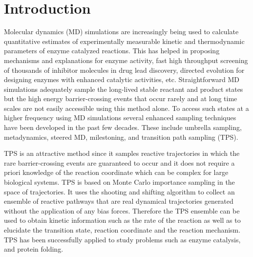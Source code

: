 \documentclass[journal=jpcbfk,manuscript=article,layout=traditional]{achemso}
\begin{document}
\section{Introduction}
Molecular dynamics (MD) simulations are increasingly being
used to calculate quantitative estimates of experimentally measurable 
kinetic and thermodynamic parameters of enzyme catalyzed reactions. 
\cite{Karplus02NatStructMolBiol9p646,
Schramm98AnnuRevBiochem67p693,Zhang05AccChemRes38p379,
Schramm11AnnuRevBiochem80p703,Schramm18ChemRev118p11194} 
This has helped in proposing mechanisms and explanations for 
enzyme activity, fast high throughput screening of thousands of inhibitor 
molecules in drug lead discovery, \cite{Jorgensen09AccChemRes42p724,Sliwoski14PharmacolRev66p334} 
directed evolution for designing enzymes with enhanced catalytic 
activities, \cite{Nunez06JPhysChemA110p463,Thyme09Nature461p1300,
Bloom09PNAS106p9995,Zoi16JAmChemSoc138p3403,Schafer19JAmChemSoc141p10431} etc.    
Straightforward MD simulations adequately sample 
the long-lived stable reactant and product states 
but the high energy barrier-crossing events that occur rarely and at long 
time scales are not easily accessible using this method alone.
To access such states at a higher frequency using MD simulations 
several enhanced sampling techniques 
have been developed in the past few decades. These include 
umbrella sampling, \cite{Kastner11WileyInterdiscipRevComputMolSci1p932} 
metadynamics, \cite{Barducci11WileyInterdiscipRevComputMolSci1p826}
steered MD, \cite{Park04JChemPhys120p5946}
milestoning, \cite{Faradjian04JChemPhys120p10880} and transition path sampling 
(TPS). \cite{Pratt86JChemPhys85p5045,Bolhuis02AnnRevPhysChem53p291,
Dellago98JChemPhys108p1964,Bolhuis21AdvTheory4p2000237}

TPS is an attractive method since it samples reactive trajectories
in which the rare barrier-crossing events are guaranteed to occur and
it does not require a priori knowledge of the reaction coordinate which can be 
complex for large biological systems.
TPS is based on Monte Carlo importance sampling in the 
space of trajectories. It uses the shooting and shifting algorithm 
to collect an ensemble of reactive pathways that are real dynamical 
trajectories generated without the application of any bias forces. \cite{dellago02AdvChemPhys123} 
Therefore the TPS ensemble can be used to obtain 
kinetic information such as the rate of the reaction as well as to elucidate 
the transition state, reaction coordinate and the reaction mechanism. 
TPS has been successfully applied to study problems such as enzyme catalysis, 
\cite{Basner05JAmChemSoc127p13822,Ramon07JPhysChemB111p5708,Hay12NatChem4p161,Schwartz09NatChemBiol5p551} 
and protein folding. \cite{Bolhuis03ProcNatlAcadSci100p12129,Juraszek12ChemPhys396p30}
\end{document}
